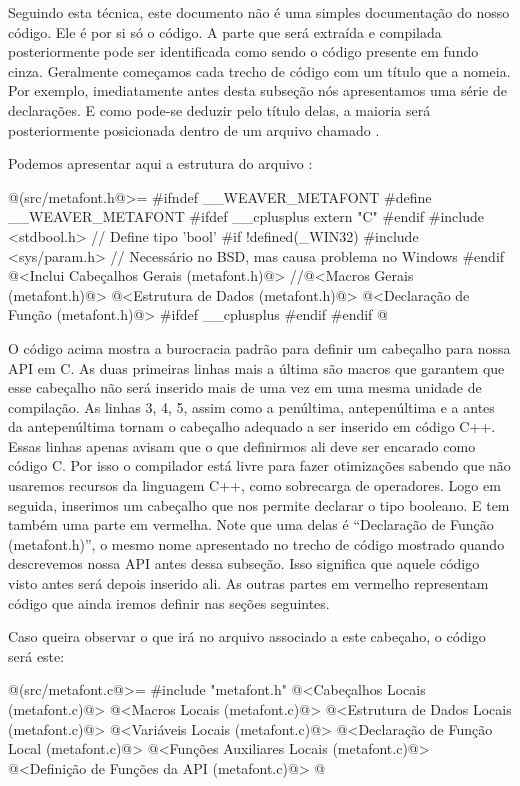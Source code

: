 Seguindo esta técnica, este documento não é uma simples documentação
do nosso código. Ele é por si só o código. A parte que será extraída e
compilada posteriormente pode ser identificada como sendo o código
presente em fundo cinza. Geralmente começamos cada trecho de código
com um título que a nomeia. Por exemplo, imediatamente antes desta
subseção nós apresentamos uma série de declarações. E como pode-se
deduzir pelo título delas, a maioria será posteriormente posicionada
dentro de um arquivo chamado .

Podemos apresentar aqui a estrutura do arquivo
:

\iniciocodigo
@(src/metafont.h@>=
#ifndef __WEAVER_METAFONT
#define __WEAVER_METAFONT
#ifdef __cplusplus
extern "C" {
#endif
#include <stdbool.h> // Define tipo 'bool'
#if !defined(_WIN32)
#include <sys/param.h> // Necessário no BSD, mas causa problema no Windows
#endif
@<Inclui Cabeçalhos Gerais (metafont.h)@>
//@<Macros Gerais (metafont.h)@>
@<Estrutura de Dados (metafont.h)@>
@<Declaração de Função (metafont.h)@>
#ifdef __cplusplus
}
#endif
#endif
@
\fimcodigo

O código acima mostra a burocracia padrão para definir um cabeçalho
para nossa API em C. As duas primeiras linhas mais a última são macros
que garantem que esse cabeçalho não será inserido mais de uma vez em
uma mesma unidade de compilação. As linhas 3, 4, 5, assim como a
penúltima, antepenúltima e a antes da antepenúltima tornam o cabeçalho
adequado a ser inserido em código C++. Essas linhas apenas avisam que
o que definirmos ali deve ser encarado como código C. Por isso o
compilador está livre para fazer otimizações sabendo que não usaremos
recursos da linguagem C++, como sobrecarga de operadores. Logo em
seguida, inserimos um cabeçalho que nos permite declarar o tipo
booleano. E tem também uma parte em vermelha. Note que uma delas é
``Declaração de Função (metafont.h)'', o mesmo nome apresentado no
trecho de código mostrado quando descrevemos nossa API antes dessa
subseção. Isso significa que aquele código visto antes será depois
inserido ali. As outras partes em vermelho representam código que
ainda iremos definir nas seções seguintes.

Caso queira observar o que irá no arquivo 
associado a este cabeçaho, o código será este:

\iniciocodigo
@(src/metafont.c@>=
#include "metafont.h"
@<Cabeçalhos Locais (metafont.c)@>
@<Macros Locais (metafont.c)@>
@<Estrutura de Dados Locais (metafont.c)@>
@<Variáveis Locais (metafont.c)@>
@<Declaração de Função Local (metafont.c)@>
@<Funções Auxiliares Locais (metafont.c)@>
@<Definição de Funções da API (metafont.c)@>
@
\fimcodigo

